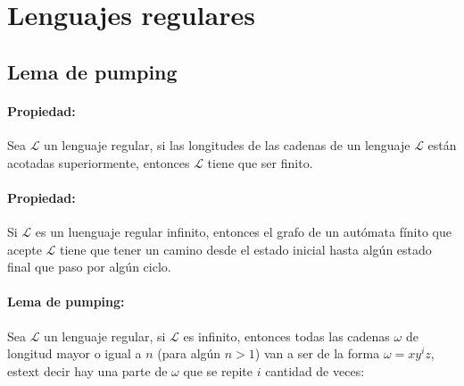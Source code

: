 \section{Lenguajes regulares}
\label{sec:pumping}
\subsection{Lema de pumping}
\label{subsec:pumping}
\paragraph{Propiedad:} Sea \(\mathcal{L}\) un lenguaje regular, si las longitudes de las cadenas de un lenguaje \(\mathcal{L}\) están acotadas superiormente, entonces \(\mathcal{L}\) tiene que ser finito.

\paragraph{Propiedad:} Si \(\mathcal{L}\) es un luenguaje regular infinito, entonces el grafo de un autómata fínito que acepte \(\mathcal{L}\) tiene que tener un camino desde el estado inicial hasta algún estado final que paso por algún ciclo.

\paragraph{Lema de pumping:} Sea \(\mathcal{L}\) un lenguaje regular, si \(\mathcal{L}\) es infinito, entonces todas las cadenas \(\omega\) de longitud mayor o igual a \(n\) (para algún \(n > 1\)) van a ser de la forma \(\omega=xy^iz\), estext decir hay una parte de \(\omega\) que se repite \(i\) cantidad de veces:

